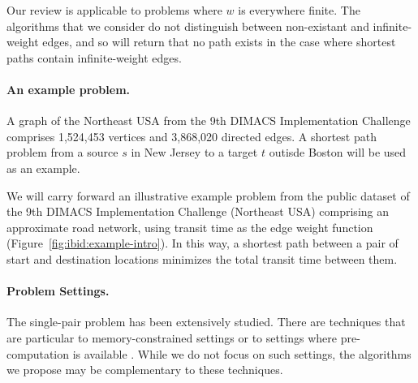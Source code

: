 Our review is applicable to problems where $w$ is everywhere finite.
The algorithms that we consider do not distinguish between non-existant
and infinite-weight edges,
and so will return that no path exists in the case where shortest
paths contain infinite-weight edges.

\paragraph{An example problem.}
\begin{marginfigure}%
   \centering%
   \caption{A graph of the Northeast USA from the 9th DIMACS
      Implementation Challenge
      comprises 1,524,453 vertices and 3,868,020 directed edges.
      A shortest path problem from a source $s$ in New Jersey
      to a target $t$ outisde Boston
      will be used as an example.}%
   \label{fig:ibid:example-intro}%
\end{marginfigure}
We will carry forward an illustrative example problem from
the public dataset of the 9th DIMACS Implementation Challenge
\citep{demetrescuetal2006dimacs9}
(Northeast USA)
comprising an approximate road network,
using transit time as the edge weight function
(Figure~\ref{fig:ibid:example-intro}).
In this way,
a shortest path between a pair of start and destination locations
minimizes the total transit time between them.

\paragraph{Problem Settings.}
The single-pair problem has been extensively studied.
There are techniques that are particular to memory-constrained
settings \citep{kaindl1997biheurreconsidered}
or to settings where pre-computation is available
\citep{goldberg2007pointtopoint}.
While we do not focus on such settings,
the algorithms we propose may be complementary to these techniques.

